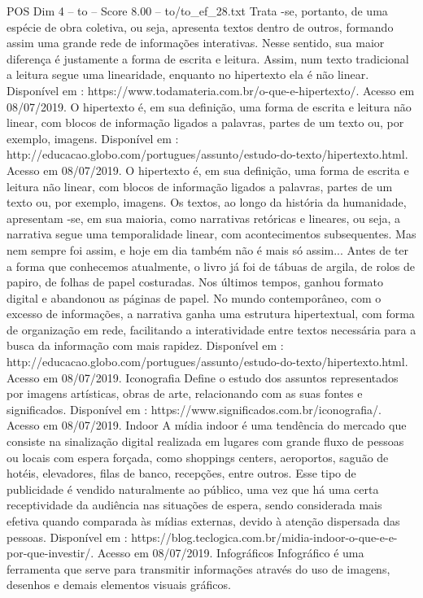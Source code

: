 \begin{textsample}{POS Dim 4 – to – Score 8.00 – to/to\_ef\_28.txt}
Trata -se, portanto, de uma espécie de obra coletiva, ou seja, apresenta textos dentro de outros, formando assim uma grande rede de informações interativas.
Nesse sentido, sua maior diferença é justamente a forma de escrita e leitura.
Assim, num texto tradicional a leitura segue uma linearidade, enquanto no hipertexto ela é não linear.
Disponível em : https://www.todamateria.com.br/o-que-e-hipertexto/.
Acesso em 08/07/2019.
O hipertexto é, em sua definição, uma forma de escrita e leitura não linear, com blocos de informação ligados a palavras, partes de um texto ou, por exemplo, imagens.
Disponível em : http://educacao.globo.com/portugues/assunto/estudo-do-texto/hipertexto.html.
Acesso em 08/07/2019.
O hipertexto é, em sua definição, uma forma de escrita e leitura não linear, com blocos de informação ligados a palavras, partes de um texto ou, por exemplo, imagens.
Os textos, ao longo da história da humanidade, apresentam -se, em sua maioria, como narrativas retóricas e lineares, ou seja, a narrativa segue uma temporalidade linear, com acontecimentos subsequentes.
Mas nem sempre foi assim, e hoje em dia também não é mais só assim...
Antes de ter a forma que conhecemos atualmente, o livro já foi de tábuas de argila, de rolos de papiro, de folhas de papel costuradas.
Nos últimos tempos, ganhou formato digital e abandonou as páginas de papel.
No mundo contemporâneo, com o excesso de informações, a narrativa ganha uma estrutura hipertextual, com forma de organização em rede, facilitando a interatividade entre textos necessária para a busca da informação com mais rapidez.
Disponível em : http://educacao.globo.com/portugues/assunto/estudo-do-texto/hipertexto.html.
Acesso em 08/07/2019.
Iconografia Define o estudo dos assuntos representados por imagens artísticas, obras de arte, relacionando com as suas fontes e significados.
Disponível em : https://www.significados.com.br/iconografia/.
Acesso em 08/07/2019.
Indoor A mídia indoor é uma tendência do mercado que consiste na sinalização digital realizada em lugares com grande fluxo de pessoas ou locais com espera forçada, como shoppings centers, aeroportos, saguão de hotéis, elevadores, filas de banco, recepções, entre outros.
Esse tipo de publicidade é vendido naturalmente ao público, uma vez que há uma certa receptividade da audiência nas situações de espera, sendo considerada mais efetiva quando comparada às mídias externas, devido à atenção dispersada das pessoas.
Disponível em : https://blog.teclogica.com.br/midia-indoor-o-que-e-e-por-que-investir/.
Acesso em 08/07/2019.
Infográficos Infográfico é uma ferramenta que serve para transmitir informações através do uso de imagens, desenhos e demais elementos visuais gráficos.

\end{textsample}
